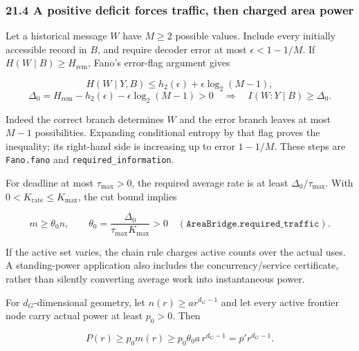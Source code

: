 \documentclass[
]{article}
\begin{document}
\subsubsection{21.4 A positive deficit forces traffic, then charged area
power}\label{a-positive-deficit-forces-traffic-then-charged-area-power}

Let a historical message \(W\) have \(M\ge2\) possible values. Include
every initially accessible record in \(B\), and require decoder error at
most \(\epsilon<1-1/M\). If \(H(W\mid B)\ge H_{\mathrm{rem}}\), Fano's
error-flag argument gives

\[
H(W\mid Y,B)\le h_2(\epsilon)+\epsilon\log_2(M-1),
\] \[
\Delta_0=H_{\mathrm{rem}}-h_2(\epsilon)-\epsilon\log_2(M-1)>0
\quad\Longrightarrow\quad I(W:Y\mid B)\ge\Delta_0.
\]

Indeed the correct branch determines \(W\) and the error branch leaves
at most \(M-1\) possibilities. Expanding conditional entropy by that
flag proves the inequality; its right-hand side is increasing up to
error \(1-1/M\). These steps are \texttt{Fano.fano} and
\texttt{r\allowbreak{}e\allowbreak{}q\allowbreak{}u\allowbreak{}i\allowbreak{}r\allowbreak{}e\allowbreak{}d\allowbreak{}\_\allowbreak{}i\allowbreak{}n\allowbreak{}f\allowbreak{}o\allowbreak{}r\allowbreak{}m\allowbreak{}a\allowbreak{}t\allowbreak{}i\allowbreak{}o\allowbreak{}n}.

For deadline at most \(\tau_{\max}>0\), the required average rate is at
least \(\Delta_0/\tau_{\max}\). With
\(0<K_{\mathrm{rate}}\le K_{\max}\), the cut bound implies

\[
m\ge\theta_0 n,\qquad
\theta_0=\frac{\Delta_0}{\tau_{\max}K_{\max}}>0
\quad(\texttt{AreaBridge.required\_traffic}).
\]

If the active set varies, the chain rule charges active counts over the
actual uses. A standing-power application also includes the
c\allowbreak{}o\allowbreak{}n\allowbreak{}c\allowbreak{}u\allowbreak{}r\allowbreak{}r\allowbreak{}e\allowbreak{}n\allowbreak{}c\allowbreak{}y\allowbreak{}/\allowbreak{}s\allowbreak{}e\allowbreak{}r\allowbreak{}v\allowbreak{}i\allowbreak{}c\allowbreak{}e
certificate, rather than silently converting average work into
instantaneous power.

For \(d_G\)-dimensional geometry, let \(n(r)\ge a r^{d_G-1}\) and let
every active frontier node carry actual power at least \(p_0>0\). Then

\[
P(r)\ge p_0m(r)\ge p_0\theta_0a\,r^{d_G-1}
=p'r^{d_G-1}.
\]
\end{document}

